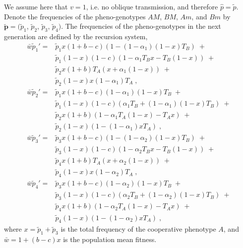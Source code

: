 \documentclass[12pt]{extarticle}
\let\vec\mathbf
\begin{document}
\begin{appendices}
We assume here that $v=1$, i.e. no oblique transmission, and therefore $\hat{p}=\tilde{p}$.
Denote the frequencies of the pheno-genotypes $AM$, $BM$, $Am$, and $Bm$ by $\vec{\tilde{p}}= (\tilde{p}_1$, $\tilde{p}_2$, $\tilde{p}_3$, $\tilde{p}_4)$. 
The frequencies of the pheno-genotypes in the next generation are defined by the recursion system, 
\begin{equation} \label{eq:next_gen_p_1}
  \begin{aligned}
  \bar{w}\tilde{p}_1' = 
  & \tilde{p}_1 x (1+b-c)(1 - (1-\alpha_1)(1-x)T_B) \;+ \\
  & \tilde{p}_1(1-x)(1-c)(1-\alpha_1T_B x - T_B(1-x)) \;+ \\
  & \tilde{p}_2 x (1+b)T_A(x + \alpha_1(1-x)) \;+ \\
  & \tilde{p}_2(1-x)x(1-\alpha_1)T_A \;,
\\
  \bar{w}\tilde{p}_2' = 
  & \tilde{p}_1 x (1+b-c)(1-\alpha_1)(1-x)T_B \;+ \\
  & \tilde{p}_1(1-x)(1-c)(\alpha_1 T_B + (1-\alpha_1)(1-x)T_B) \;+ \\
  & \tilde{p}_2 x (1+b)(1-\alpha_1 T_A(1-x) - T_A x) \;+ \\
& \tilde{p}_2(1-x)(1 - (1-\alpha_1) x T_A) \;, 
\\
  \bar{w}\tilde{p}_3' =
  & \tilde{p}_3 x (1+b-c)(1 - (1-\alpha_2)(1-x)T_B) \;+ \\
  & \tilde{p}_3(1-x)(1-c)(1-\alpha_2 T_B x - T_B(1-x)) \;+ \\
  & \tilde{p}_4 x (1+b)T_A(x + \alpha_2 (1-x)) \;+ \\
  & \tilde{p}_4(1-x) x (1-\alpha_2)T_A \;, 
\\
  \bar{w}\tilde{p}_4' =
  & \tilde{p}_3 x (1+b-c)(1-\alpha_2)(1-x)T_B \;+ \\
  & \tilde{p}_3(1-x)(1-c)(\alpha_2 T_B + (1-\alpha_2)(1-x)T_B) \;+ \\
  & \tilde{p}_4 x (1+b)(1-\alpha_2T_A(1-x)-T_A x ) \;+ \\
  & \tilde{p}_4(1-x)(1 - (1-\alpha_2) x T_A) \;,
  \end{aligned}
\end{equation}
where $x=\tilde{p}_1+\tilde{p}_3$ is the total frequency of the cooperative phenotype $A$, and $\bar{w} = 1 + (b-c) x$ is the population mean fitness.%


\end{appendices}
\end{document}
